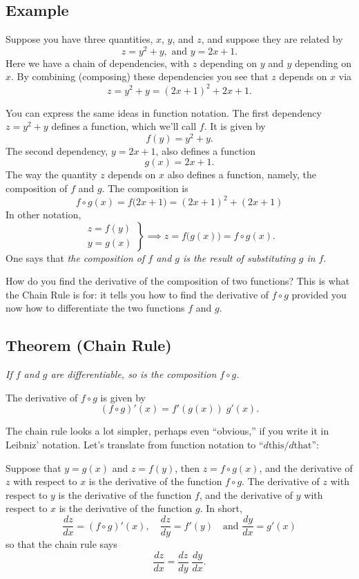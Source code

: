 \subsection{Example}
\label{sec:04composition-example}
Suppose you have three quantities, $x$, $y$, and $z$, and suppose they are
related by
\[
z=y^2+y, \text{ and } y = 2x+1.
\]
Here we have a chain of dependencies, with $z$ depending on $y$ and $y$
depending on $x$.  By combining (composing) these dependencies you see that $z$
depends on $x$ via
\[
z = y^2+y = (2x+1)^2 + 2x+1.
\]

You can express the same ideas in function notation.  The first dependency
$z=y^2+y$ defines a function, which we'll call $f$.  It is given by
\[
f(y) = y^2+y.
\]
The second dependency, $y=2x+1$, also defines a function
\[
g(x) = 2x+1.
\]
The way the quantity $z$ depends on $x$ also defines a function, namely,
the composition of $f$ and $g$.  The composition is
\[
f\circ g(x) =f\bigl(2x+1\bigr) = (2x+1)^2+(2x+1)
\]
In other notation, 
\[
\left.
\begin{array}{cc}
z=f(y) \\ y = g(x)
\end{array}
\right\}
\implies z = f\bigl(g(x)\bigr) = f\circ g(x).  
\]
One says that \emph{the composition of $f$ and $g$ is the result of
substituting $g$ in $f$}.

\medskip

How do you find the derivative of the composition of two functions?  This is
what the Chain Rule is for: it tells you how to find the derivative of $f\circ
g$ provided you now how to differentiate the two functions $f$ and $g$.

\subsection{Theorem (Chain Rule)}
\label{thm:chainRule}\itshape
If $f$ and $g$ are differentiable, so is the composition $f\circ g$.

The derivative of $f\circ g$ is given by
\[
(f\circ g)'(x) = f'(g(x))\;g'(x).
\]\upshape


The chain rule looks a lot simpler, perhaps even ``obvious,'' if you write it in
Leibniz' notation.  Let's translate from function notation to ``$d\text{this}
/d\text{that}$'':

Suppose that $y=g(x)$ and $z=f(y)$, then $z=f\circ g(x)$, and
the derivative of $z$ with respect to $x$ is the derivative of the function
$f\circ g$.  The derivative of $z$ with respect to $y$ is the derivative of the
function $f$, and the derivative of $y$ with respect to $x$ is the derivative of
the function $g$.  In short,
\[
\frac{dz}{dx} =(f\circ g)'(x),\quad
\frac{dz}{dy} = f'(y) \quad\text{and }
\frac{dy}{dx} = g'(x)
\]
so that the chain rule says
\begin{equation}\label{eq:chainrule-ala-Leibniz}
  \frac{dz}{dx} = \frac{dz}{dy} \; \frac{dy}{dx}.
\end{equation}
